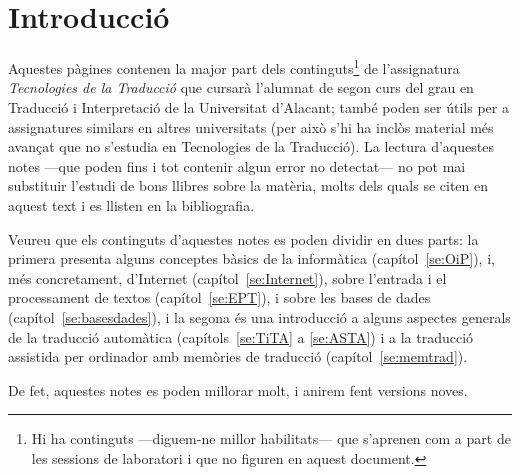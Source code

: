 \chapter{Introducció}


Aquestes pàgines contenen la major part dels continguts\footnote{Hi ha
  continguts ---diguem-ne millor habilitats--- que s'aprenen com a
  part de les sessions de laboratori i que no figuren en aquest
  document.} de l'assignatura \emph{Tecnologies de la Traducció} que
cursarà l'alumnat de segon curs del grau en Traducció i Interpretació
de la Universitat d'Alacant; també poden ser útils per a assignatures
similars en altres universitats (per això s'hi ha inclòs material més
avançat que no s'estudia en Tecnologies de la Traducció).  La lectura
d'aquestes notes ---que poden fins i tot contenir algun error no
detectat--- no pot mai substituir l'estudi de bons llibres sobre la
matèria, molts dels quals se citen en aquest text i es llisten en la
bibliografia.
  
Veureu que els continguts d'aquestes notes es poden dividir en dues
parts: la primera presenta alguns conceptes bàsics de la informàtica
(capítol~\ref{se:OiP}), i, més concretament, d'Internet
(capítol~\ref{se:Internet}), sobre l'entrada i el processament de
textos (capítol~\ref{se:EPT}), i sobre les bases de dades
(capítol~\ref{se:basesdades}), i la segona és una introducció a alguns
aspectes generals de la traducció automàtica (capítols~\ref{se:TiTA} a
\ref{se:ASTA}) i a la traducció assistida per ordinador amb memòries
de traducció (capítol~\ref{se:memtrad}).
  
  De fet, aquestes notes es poden millorar molt, i anirem fent
  versions noves.
  
